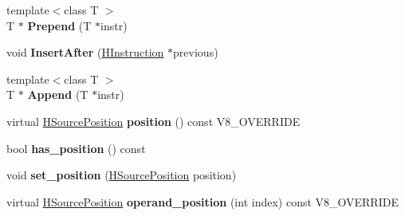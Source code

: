\begin{DoxyCompactItemize}
\item 
\hypertarget{classv8_1_1internal_1_1_h_instruction_af8ae4eebc5b54317669978c2f9d2b498}{}{\footnotesize template$<$class T $>$ }\\T $\ast$ {\bfseries Prepend} (T $\ast$instr)\label{classv8_1_1internal_1_1_h_instruction_af8ae4eebc5b54317669978c2f9d2b498}

\item 
\hypertarget{classv8_1_1internal_1_1_h_instruction_a400c1cad5a34fa123931d641721ae77f}{}void {\bfseries Insert\+After} (\hyperlink{classv8_1_1internal_1_1_h_instruction}{H\+Instruction} $\ast$previous)\label{classv8_1_1internal_1_1_h_instruction_a400c1cad5a34fa123931d641721ae77f}

\item 
\hypertarget{classv8_1_1internal_1_1_h_instruction_ad065b646bfd3bd2626eda41a82fe55ce}{}{\footnotesize template$<$class T $>$ }\\T $\ast$ {\bfseries Append} (T $\ast$instr)\label{classv8_1_1internal_1_1_h_instruction_ad065b646bfd3bd2626eda41a82fe55ce}

\item 
\hypertarget{classv8_1_1internal_1_1_h_instruction_a66c22eb0c27f5367b0ddf8de9c1ac5d9}{}virtual \hyperlink{classv8_1_1internal_1_1_h_source_position}{H\+Source\+Position} {\bfseries position} () const V8\+\_\+\+O\+V\+E\+R\+R\+I\+D\+E\label{classv8_1_1internal_1_1_h_instruction_a66c22eb0c27f5367b0ddf8de9c1ac5d9}

\item 
\hypertarget{classv8_1_1internal_1_1_h_instruction_a344ac3efbe9ec162686efc31d37c3b03}{}bool {\bfseries has\+\_\+position} () const \label{classv8_1_1internal_1_1_h_instruction_a344ac3efbe9ec162686efc31d37c3b03}

\item 
\hypertarget{classv8_1_1internal_1_1_h_instruction_a2dbad26a6922dee15004f02de3661f23}{}void {\bfseries set\+\_\+position} (\hyperlink{classv8_1_1internal_1_1_h_source_position}{H\+Source\+Position} position)\label{classv8_1_1internal_1_1_h_instruction_a2dbad26a6922dee15004f02de3661f23}

\item 
\hypertarget{classv8_1_1internal_1_1_h_instruction_a501a7f76e4c532d382968e53002f2025}{}virtual \hyperlink{classv8_1_1internal_1_1_h_source_position}{H\+Source\+Position} {\bfseries operand\+\_\+position} (int index) const V8\+\_\+\+O\+V\+E\+R\+R\+I\+D\+E\label{classv8_1_1internal_1_1_h_instruction_a501a7f76e4c532d382968e53002f2025}


\end{DoxyCompactItemize}
